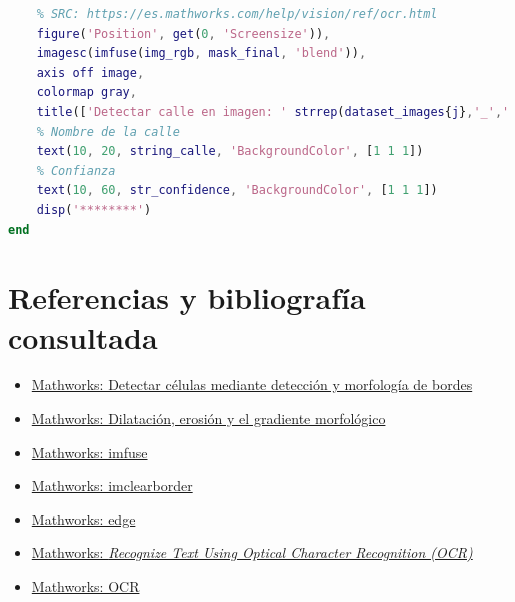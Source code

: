 \documentclass[12pt]{article}
\begin{document}
\begin{lstlisting}[language=matlab, caption={Código implementado para segmentación y OCR de carteles de calles, utilizando morfología matemática}]
	% Overlay
	% SRC: https://es.mathworks.com/help/vision/ref/ocr.html
	figure('Position', get(0, 'Screensize')),
	imagesc(imfuse(img_rgb, mask_final, 'blend')),
	axis off image,
	colormap gray,
	title(['Detectar calle en imagen: ' strrep(dataset_images{j},'_',' ')])
	% Nombre de la calle
	text(10, 20, string_calle, 'BackgroundColor', [1 1 1])
	% Confianza
	text(10, 60, str_confidence, 'BackgroundColor', [1 1 1])
	disp('********')
end
\end{lstlisting}

\section{Referencias y bibliografía consultada}
\begin{itemize}
	
	\item
	\href{https://es.mathworks.com/help/images/detecting-a-cell-using-image-segmentation.html}{Mathworks: Detectar células mediante detección y morfología de bordes}
	
	\item
	\href{https://blogs.mathworks.com/steve/2006/09/25/dilation-erosion-and-the-morphological-gradient/}{Mathworks: Dilatación, erosión y el gradiente morfológico}
	
	\item
	\href{https://es.mathworks.com/help/images/ref/imfuse.html}{Mathworks: imfuse}
	
	\item
	\href{https://es.mathworks.com/help/images/ref/imclearborder.html}{Mathworks: imclearborder}
	
	\item
	\href{https://es.mathworks.com/help/images/ref/edge.html}{Mathworks: edge}
	
	\item
	\href{https://es.mathworks.com/help/vision/ug/recognize-text-using-optical-character-recognition-ocr.html}{Mathworks: \textit{Recognize Text Using Optical Character Recognition (OCR)}}
	
	\item
	\href{https://es.mathworks.com/help/vision/ref/ocr.html}{Mathworks: OCR}
\end{itemize}
	
\end{document}
